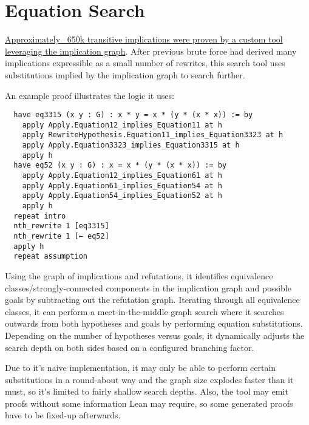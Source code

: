 \chapter{Equation Search}\label{equation-search-chapter}

\href{https://github.com/teorth/equational_theories/tree/main/equational_theories/Generated/EquationSearch}{Approximately ~650k transitive implications were proven by a custom tool leveraging the implication graph}. After previous brute force had derived many implications expressible as a small number of rewrites, this search tool uses substitutions implied by the implication graph to search further.

An example proof illustrates the logic it uses:

\begin{verbatim}
  have eq3315 (x y : G) : x * y = x * (y * (x * x)) := by
    apply Apply.Equation12_implies_Equation11 at h
    apply RewriteHypothesis.Equation11_implies_Equation3323 at h
    apply Apply.Equation3323_implies_Equation3315 at h
    apply h
  have eq52 (x y : G) : x = x * (y * (x * x)) := by
    apply Apply.Equation12_implies_Equation61 at h
    apply Apply.Equation61_implies_Equation54 at h
    apply Apply.Equation54_implies_Equation52 at h
    apply h
  repeat intro
  nth_rewrite 1 [eq3315]
  nth_rewrite 1 [← eq52]
  apply h
  repeat assumption
\end{verbatim}

Using the graph of implications and refutations, it identifies equivalence classes/strongly-connected components in the implication graph and possible goals by subtracting out the refutation graph. Iterating through all equivalence classes, it can perform a meet-in-the-middle graph search where it searches outwards from both hypotheses and goals by performing equation substitutions. Depending on the number of hypotheses versus goals, it dynamically adjusts the search depth on both sides based on a configured branching factor.

Due to it's naive implementation, it may only be able to perform certain substitutions in a round-about way and the graph size explodes faster than it must, so it's limited to fairly shallow search depths. Also, the tool may emit proofs without some information Lean may require, so some generated proofs have to be fixed-up afterwards.
